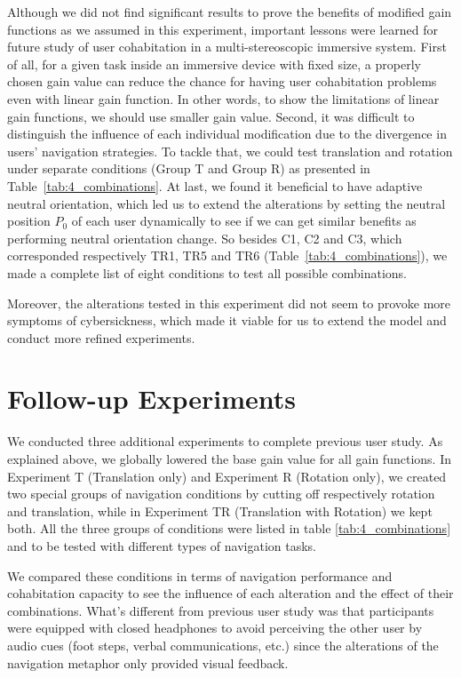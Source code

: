 Although we did not find significant results to prove the benefits of modified gain functions as we assumed in this experiment, important lessons were learned for future study of user cohabitation in a multi-stereoscopic immersive system. First of all, for a given task inside an immersive device with fixed size, a properly chosen gain value can reduce the chance for having user cohabitation problems even with linear gain function. In other words, to show the limitations of linear gain functions, we should use smaller gain value. Second, it was difficult to distinguish the influence of each individual modification due to the divergence in users' navigation strategies. To tackle that, we could test translation and rotation under separate conditions (Group T and Group R) as presented in Table~\ref{tab:4_combinations}. At last, we found it beneficial to have adaptive neutral orientation, which led us to extend the alterations by setting the neutral position $P_{0}$ of each user dynamically to see if we can get similar benefits as performing neutral orientation change. So besides C1, C2 and C3, which corresponded respectively TR1, TR5 and TR6 (Table~\ref{tab:4_combinations}), we made a complete list of eight conditions to test all possible combinations.

Moreover, the alterations tested in this experiment did not seem to provoke more symptoms of cybersickness, which made it viable for us to extend the model and conduct more refined experiments.

\section{Follow-up Experiments}
We conducted three additional experiments to complete previous user study. As explained above, we globally lowered the base gain value for all gain functions. In Experiment T (Translation only) and Experiment R (Rotation only), we created two special groups of navigation conditions by cutting off respectively rotation and translation, while in Experiment TR (Translation with Rotation) we kept both. All the three groups of conditions were listed in table \ref{tab:4_combinations} and to be tested with different types of navigation tasks. 

We compared these conditions in terms of navigation performance and cohabitation capacity to see the influence of each alteration and the effect of their combinations. What's different from previous user study was that participants were equipped with closed headphones to avoid perceiving the other user by audio cues (foot steps, verbal communications, etc.) since the alterations of the navigation metaphor only provided visual feedback.


